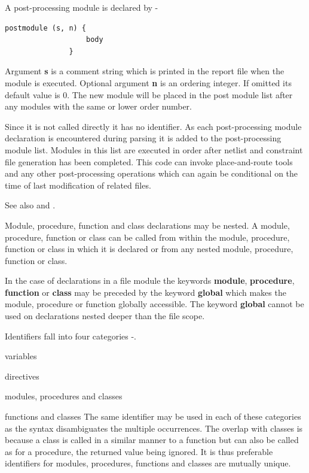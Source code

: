             A post-processing module is declared by -
            \begin{lstlisting}[gobble=12, language=threepl]
               postmodule (s, n) {
                   body
               }
            \end{lstlisting}
            Argument {\bf s} is a comment string which is printed in the report
            file when the module is executed. Optional argument {\bf n} is an
            ordering integer. If omitted its default value is 0. The new module
            will be placed in the post module list after any modules with the
            same or lower order number.

            Since it is not called directly it has no identifier. As each
            post-processing module declaration is encountered during parsing it
            is added to the post-processing module list. Modules in this list
            are executed in order after netlist and constraint file generation
            has been completed. This code can invoke place-and-route
            tools and any other post-processing operations which can again
            be conditional on the time of last modification of related files.
            
            See also  and .
                     
            Module, procedure, function and class declarations may be nested. A
            module, procedure, function or class can be called from within the
            module, procedure, function or class in which it is declared or from
            any nested module, procedure, function or class.

            In the case of declarations in a file module the keywords {\bf
            module}, {\bf procedure}, {\bf function} or {\bf class} may be
            preceded by the keyword {\bf global} which makes the module, procedure
            or function globally accessible. The keyword {\bf global} cannot be
            used on declarations nested deeper than the file scope.
        
            Identifiers fall into four categories -.
            \blist
            \item   variables
            \item   directives
            \item   modules, procedures and classes
            \item   functions and classes
            \blend
            The same identifier may be used in each of these categories as the
            syntax disambiguates the multiple occurrences. The overlap with
            classes is because a class is called in a similar manner to a
            function but can also be called as for a procedure, the returned
            value being ignored. It is thus preferable identifiers for modules,
            procedures, functions and classes are mutually unique.
            

